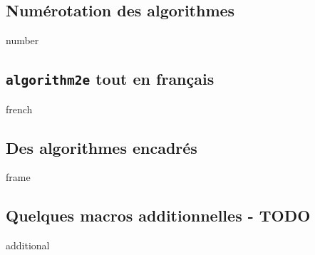 \subsection{Numérotation des algorithmes}

{number}




\subsection{\texttt{algorithm2e} tout en français}

{french}




\subsection{Des algorithmes encadrés}

{frame}




\subsection{Quelques macros additionnelles - TODO} \label{algo-extra}

{additional}